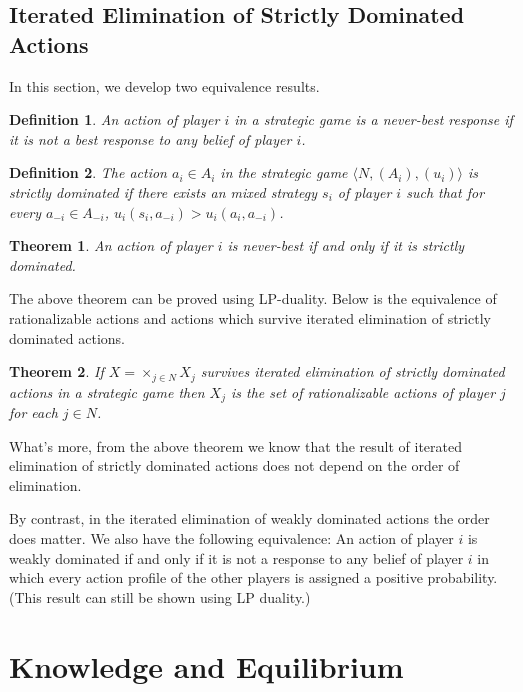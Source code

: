\documentclass[openany]{book}
\newtheorem{definition}{Definition}[chapter]
\newtheorem{theorem}{Theorem}[chapter]
\begin{document}
\section{Iterated Elimination of Strictly Dominated Actions}
In this section, we develop two equivalence results.
\begin{definition}
An action of player $i$ in a strategic game is a never-best response if it is not a best response to any belief of player $i$.
\end{definition}
\begin{definition}
The action $a_i\in A_i$ in the strategic game $\langle N,(A_i),(u_i)\rangle$ is strictly dominated if there exists an mixed strategy $s_i$ of player $i$ such that for every $a_{-i}\in A_{-i}$, $u_i(s_i,a_{-i})>u_i(a_i,a_{-i})$.
\end{definition}
\begin{theorem}
An action of player $i$ is never-best if and only if it is strictly dominated.
\end{theorem}
The above theorem can be proved using LP-duality. Below is the equivalence of rationalizable actions and actions which survive iterated elimination of strictly dominated actions.
\begin{theorem}
If $X=\times_{j\in N}X_j$ survives iterated elimination of strictly dominated actions in a strategic game then $X_j$ is the set of rationalizable actions of player $j$ for each $j\in N$.
\end{theorem}
What's more, from the above theorem we know that the result of iterated elimination of strictly dominated actions does not depend on the order of elimination.

By contrast, in the iterated elimination of weakly dominated actions the order does matter. We also have the following equivalence: An action of player $i$ is weakly dominated if and only if it is not a response to any belief of player $i$ in which every action profile of the other players is assigned a positive probability. (This result can still be shown using LP duality.)

\chapter{Knowledge and Equilibrium}
\end{document}
